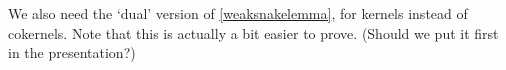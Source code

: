 %
%

We also need the `dual' version of \ref{weaksnakelemma}, for kernels instead of cokernels.
Note that this is actually a bit easier to prove.
(Should we put it first in the presentation?)


